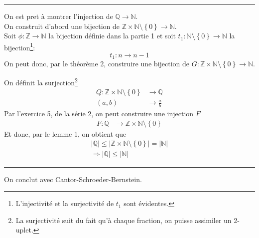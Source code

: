 \documentclass[11pt, a4paper, twoside]{article}
\newcommand\hr{
    \noindent\rule[0.5ex]{\linewidth}{0.5pt}\newline
}
\begin{document}
\hr
On est pret à montrer l'injection de $\mathbb{Q} \to \mathbb{N}$.\\
On construit d'abord une bijection de $ \mathbb{Z} \times \mathbb{N} \setminus \left\{ 0 \right\} \to \mathbb{N} $.\\
Soit $\phi: \mathbb{Z} \to \mathbb{N}$ la bijection définie dans la partie 1 et soit $t_1: \mathbb{N} \setminus \left\{ 0 \right\} \to \mathbb{N}$ la bijection\footnote{L'injectivité et la surjectivité de $t_1$ sont évidentes.}:
\[ 
t_1: n \to n-1
\]
On peut donc, par le théorème 2, construire une bijection de $G:\mathbb{Z} \times \mathbb{N} \setminus \left\{ 0 \right\} \to \mathbb{N} $.

On définit la surjection\footnote{La surjectivité suit du fait qu'à chaque fraction, on puisse assimiler un 2-uplet.}
 \begin{align*}
	 Q: \mathbb{Z} \times \mathbb{N} \setminus \left\{ 0 \right\} &\to \mathbb{Q}\\
	 ( a,b) & \to \frac{a}{b}
\end{align*}
Par l'exercice 5, de la série 2, on peut construire une injection $F$
\begin{align*}
	F: \mathbb{Q} &\to \mathbb{Z} \times \mathbb{N} \setminus \left\{ 0 \right\} 
\end{align*}
Et donc, par le lemme 1, on obtient que
\begin{align*}
|\mathbb{Q}| \leq |\mathbb{Z} \times \mathbb{N} \setminus \left\{ 0 \right\}| = |\mathbb{N}|\\
\Rightarrow | \mathbb{Q}| \leq |\mathbb{N}|
\end{align*}
\hr
On conclut avec Cantor-Schroeder-Bernstein.
\end{document}
